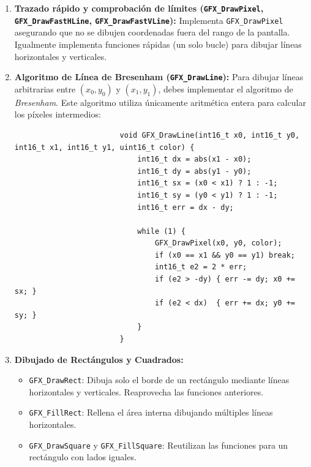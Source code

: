 \documentclass[../main.tex]{subfiles}
\begin{document}
            \begin{enumerate}
                \item \textbf{Trazado rápido y comprobación de límites (\texttt{GFX\_DrawPixel}, \texttt{GFX\_DrawFastHLine}, \texttt{GFX\_DrawFastVLine}):}
                    Implementa \texttt{GFX\_DrawPixel} asegurando que no se dibujen coordenadas fuera del rango de la pantalla. Igualmente implementa funciones rápidas (un solo bucle) para dibujar líneas horizontales y verticales.

                \item \textbf{Algoritmo de Línea de Bresenham (\texttt{GFX\_DrawLine}):}
                    Para dibujar líneas arbitrarias entre $(x_0, y_0)$ y $(x_1, y_1)$, debes implementar el algoritmo de \emph{Bresenham}. Este algoritmo utiliza únicamente aritmética entera para calcular los píxeles intermedios:
                    \begin{lstlisting}
                        void GFX_DrawLine(int16_t x0, int16_t y0, int16_t x1, int16_t y1, uint16_t color) {
                            int16_t dx = abs(x1 - x0);
                            int16_t dy = abs(y1 - y0);
                            int16_t sx = (x0 < x1) ? 1 : -1;
                            int16_t sy = (y0 < y1) ? 1 : -1;
                            int16_t err = dx - dy;

                            while (1) {
                                GFX_DrawPixel(x0, y0, color);
                                if (x0 == x1 && y0 == y1) break;
                                int16_t e2 = 2 * err;
                                if (e2 > -dy) { err -= dy; x0 += sx; }
                                if (e2 < dx)  { err += dx; y0 += sy; }
                            }
                        }
                    \end{lstlisting}

                \item \textbf{Dibujado de Rectángulos y Cuadrados:}
                    \begin{itemize}
                        \item \texttt{GFX\_DrawRect}: Dibuja solo el borde de un rectángulo mediante líneas horizontales y verticales. Reaprovecha las funciones anteriores.
                        \item \texttt{GFX\_FillRect}: Rellena el área interna dibujando múltiples líneas horizontales.
                        \item \texttt{GFX\_DrawSquare} y \texttt{GFX\_FillSquare}: Reutilizan las funciones para un rectángulo con lados iguales.
                    \end{itemize}


\end{enumerate}
\end{document}
